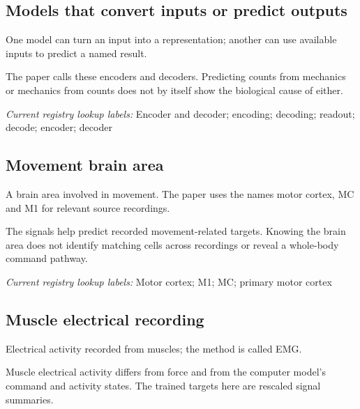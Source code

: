 \begin{samepage}
\subsection*{Models that convert inputs or predict outputs}
\noindent One model can turn an input into a representation; another can use available inputs to predict a named result.\par
\end{samepage}
\begin{samepage}
\noindent The paper calls these encoders and decoders. Predicting counts from mechanics or mechanics from counts does not by itself show the biological cause of either.\par\nopagebreak[4]

\end{samepage}


\noindent\textit{Current registry lookup labels:} Encoder and decoder; encoding; decoding; readout; decode; encoder; decoder\par

\begin{samepage}
\subsection*{Movement brain area}
\noindent A brain area involved in movement. The paper uses the names motor cortex, MC and M1 for relevant source recordings.\par
\end{samepage}
\begin{samepage}
\noindent The signals help predict recorded movement-related targets. Knowing the brain area does not identify matching cells across recordings or reveal a whole-body command pathway.\par\nopagebreak[4]

\end{samepage}


\noindent\textit{Current registry lookup labels:} Motor cortex; M1; MC; primary motor cortex\par

\begin{samepage}
\subsection*{Muscle electrical recording}
\noindent Electrical activity recorded from muscles; the method is called EMG.\par
\end{samepage}
\begin{samepage}
\noindent Muscle electrical activity differs from force and from the computer model’s command and activity states. The trained targets here are rescaled signal summaries.\par\nopagebreak[4]

\end{samepage}


